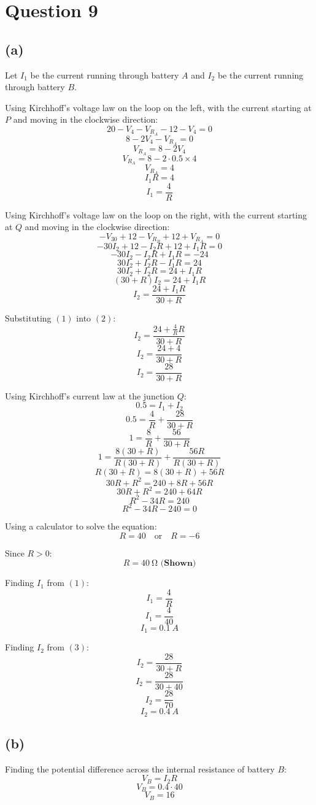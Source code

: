 \documentclass[11pt]{article}
\begin{document}
\newpage
\section{Question 9}
\label{sec:org681464e}

\subsection{(a)}
\label{sec:org4098cc1}
Let \(I_1\) be the current running through battery \(A\) and \(I_2\) be the current running through battery \(B\).


Using Kirchhoff's voltage law on the loop on the left, with the current starting at \(P\) and moving in the clockwise direction:
\[20 - V_4 - V_{R_A} - 12 - V_{4} = 0\]
\[8 - 2V_4 - V_{R_A} = 0\]
\[V_{R_A} = 8 - 2V_4\]
\[V_{R_A} = 8 - 2 \cdot 0.5 \times 4\]
\[V_{R_A} = 4\]
\[I_1R = 4\]
\[I_1 = \frac{4}{R} \tag{1}\]

Using Kirchhoff's voltage law on the loop on the right, with the current starting at \(Q\) and moving in the clockwise direction:
\[-V_{30} + 12 - V_{R_B} + 12 + V_{R_A} = 0\]
\[-30I_2 + 12 - I_2 R + 12 + I_1 R = 0\]
\[-30I_2 - I_2 R + I_1 R = -24\]
\[30I_2 + I_2 R - I_1 R = 24\]
\[30I_2 + I_2 R = 24 + I_1 R\]
\[(30 + R)I_2 = 24 + I_1 R\]
\[I_2 = \frac{24 + I_1 R}{30 + R} \tag{2}\]

\newpage

Substituting \((1)\) into \((2)\):
\[I_2 = \frac{24 + \frac{4}{R} R}{30 + R}\]
\[I_2 = \frac{24 + 4}{30 + R}\]
\[I_2 = \frac{28}{30 + R} \tag{3}\]

Using Kirchhoff's current law at the junction \(Q\):
\[0.5 = I_1 + I_2\]
\[0.5 = \frac{4}{R} + \frac{28}{30 + R}\]
\[1 = \frac{8}{R} + \frac{56}{30 + R}\]
\[1 = \frac{8(30 + R)}{R (30 + R)} + \frac{56R}{R(30 + R)}\]
\[R(30 + R) = 8(30 + R) + 56R\]
\[30R + R^2 = 240 + 8R + 56R\]
\[30R + R^2 = 240 + 64R\]
\[R^2 - 34R = 240\]
\[R^2 - 34R - 240 = 0\]

Using a calculator to solve the equation:
\[R = 40 \quad \text{or} \quad R = -6\]

Since \(R > 0\):
\[R = \qty{40}{\unit{\ohm}} \textbf{ (Shown)}\]

Finding \(I_1\) from \((1)\):
\[I_1 = \frac{4}{R}\]
\[I_1 = \frac{4}{40}\]
\[I_1 = \qty{0.1}{\unit{A}}\]

Finding \(I_2\) from \((3)\):
\[I_2 = \frac{28}{30 + R}\]
\[I_2 = \frac{28}{30 + 40}\]
\[I_2 = \frac{28}{70}\]
\[I_2 = \qty{0.4}{\unit{A}}\]
\subsection{(b)}
\label{sec:orga604868}
Finding the potential difference across the internal resistance of battery \(B\):
\[V_{B} = I_2 R\]
\[V_{B} = 0.4 \cdot 40\]
\[V_{B} = 16\]
\end{document}
